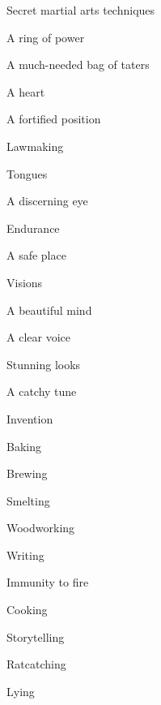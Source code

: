  
\item Secret martial arts techniques

 
\item A ring of power

 
\item A much-needed bag of taters

 
\item A heart

 
\item A fortified position

 
\item Lawmaking

 
\item Tongues

 
\item A discerning eye

 
\item Endurance

 
\item A safe place

 
\item Visions

 
\item A beautiful mind

 
\item A clear voice

 
\item Stunning looks

 
\item A catchy tune

 
\item Invention

 
\item Baking

 
\item Brewing

 
\item Smelting

 
\item Woodworking

 
\item Writing

 
\item Immunity to fire

 
\item Cooking

 
\item Storytelling

 
\item Ratcatching

 
\item Lying

